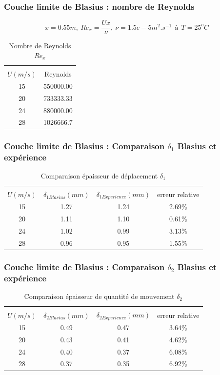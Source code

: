 \documentclass{beamer}
\begin{document}
\begin{frame}
\frametitle{Couche limite de Blasius : nombre de Reynolds}
\begin{equation*}
	x = 0.55m,~Re_{x} = \frac{Ux}{\nu},~
	\nu = 1.5e-5 m^{2}.s^{-1}~~\text{à}~~T = 25^{o}C
\end{equation*}

\begin{table}[ht]
	\centering
	\begin{tabular}{cc}
		\hline\\
		$U(m/s)$ & Reynolds\\
		\hline
   15 & 550000.00\\
   20 & 733333.33\\
   24 & 880000.00\\
   28 & 1026666.7
	\end{tabular}
	\caption{Nombre de Reynolds $Re_{x}$}
\end{table}
\end{frame}

\begin{frame}
\frametitle{Couche limite de Blasius : Comparaison $\delta_{1}$ Blasius et expérience}
\begin{table}[ht]
	\centering
	\begin{tabular}{cccc}
		\hline\\
		$U(m/s)$ & $\delta_{1Blasius}(mm)$ &
		$ \delta_{1Experience}(mm)$ & 
		 erreur relative\\
		\hline
		15   & 1.27   & 1.24   & 2.69\%\\
		20   & 1.11   & 1.10   & 0.61\%\\
		24   & 1.02   & 0.99   & 3.13\%\\
		28   & 0.96   & 0.95   & 1.55\%
	\end{tabular}
	\caption{Comparaison épaisseur de déplacement $\delta_{1}$}
\end{table}
\end{frame}

\begin{frame}
\frametitle{Couche limite de Blasius : Comparaison $\delta_{2}$ Blasius et expérience}
\begin{table}[ht]
	\centering
	\begin{tabular}{cccc}
		\hline\\
		$U(m/s)$ & $\delta_{2Blasius}(mm)$ &
		$ \delta_{2Experience}(mm)$ & 
		 erreur relative\\
		\hline
   15 & 0.49   & 0.47   & 3.64\%\\
   20 & 0.43   & 0.41   & 4.62\%\\
   24 & 0.40   & 0.37   & 6.08\%\\
   28 & 0.37   & 0.35   & 6.92\%
	\end{tabular}
	\caption{Comparaison épaisseur de quantité de mouvement $\delta_{2}$}
\end{table}
\end{frame}
\end{document}

